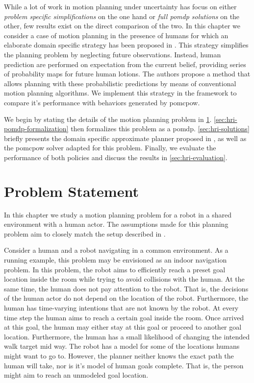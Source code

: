 While a lot of work in motion planning under uncertainty has focus on either
\emph{problem specific simplifications} on the one hand or \emph{full
\ac{pomdp} solutions} on the other, few results exist on the direct comparison
of the two. In this chapter we consider a case of motion planning in the
presence of humans for which an elaborate domain specific strategy has been
proposed in \cite{fisac2018probabilistically}. This strategy simplifies the
planning problem by neglecting future observations. Instead, human prediction
are performed on expectation from the current belief, providing series of
probability maps for future human lotions. The authors propose a method that
allows planning with these probabilistic predictions by means of conventional
motion planning algorithms. We implement this strategy in the \pomdpsjl
framework to compare it's performance with behaviors generated by
\ac{pomcpow}.

We begin by stating the details of the motion planning problem in
\cref{sec:hri-problem-statement}. \cref{sec:hri-pomdp-formalization} then
formalizes this problem as a \ac{pomdp}. \cref{sec:hri-solutions} briefly
presents the domain specific approximate planner proposed in
\cite{fisac2018probabilistically}, as well as the \ac{pomcpow} solver adapted
for this problem. Finally, we evaluate the performance of both policies and
discuss the results in \cref{sec:hri-evaluation}.

\section{Problem Statement}\label{sec:hri-problem-statement}

In this chapter we study a motion planning problem for a robot in a shared
environment with a human actor. The assumptions made for this planning problem
aim to closely match the setup described in \cite{fisac2018probabilistically}.


Consider a human and a robot navigating in a common environment. As a running
example, this problem may be envisioned as an indoor navigation problem. In
this problem, the robot aims to efficiently reach a preset goal location
inside the room while trying to avoid collisions with the human. At the same
time, the human does not pay attention to the robot. That is, the decisions of
the human actor do not depend on the location of the robot. Furthermore, the
human has time-varying intentions that are not known by the robot. At every
time step the human aims to reach a certain goal inside the room. Once arrived
at this goal, the human may either stay at this goal or proceed to another goal
location. Furthermore, the human has a small likelihood of changing the
intended walk target mid way. The robot has a model for some of the locations
humans might want to go to. However, the planner neither knows the exact path
the human will take, nor is it's model of human goals complete. That is, the
person might aim to reach an unmodeled goal location.

